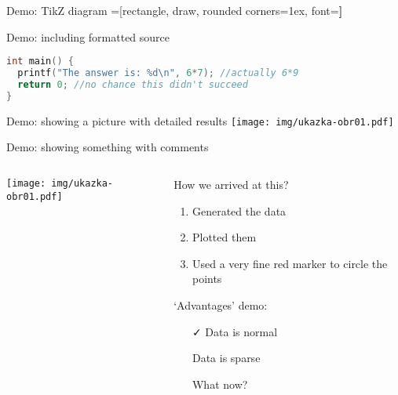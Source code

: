 \documentclass[aspectratio=169]{beamer}
\begin{document}
\begin{frame}{Demo: TikZ diagram}
\centering
{}=[rectangle, draw, rounded corners=1ex, font=\huge\bfseries]
\end{frame}

\begin{frame}[fragile]{Demo: including formatted source}

\begin{lstlisting}[language=C,showstringspaces=false,basicstyle=\tt\small,commentstyle=\color{green!50!black},keywordstyle=\bfseries\color{blue!50!black},stringstyle=\color{red!50!black}]
int main() {
  printf("The answer is: %d\n", 6*7); //actually 6*9
  return 0; //no chance this didn't succeed
}
\end{lstlisting}
\end{frame}

\begin{frame}{Demo: showing a picture with detailed results}
\centering
\texttt{[image: img/ukazka-obr01.pdf]}
\end{frame}

\begin{frame}{Demo: showing something with comments}
\begin{columns}
\begin{column}{0.5\textwidth}
\texttt{[image: img/ukazka-obr01.pdf]}
\end{column}
\begin{column}{0.5\textwidth}
How we arrived at this?
\begin{enumerate}
\item Generated the data
\item Plotted them
\item Used a very fine red marker to circle the points
\end{enumerate}

`Advantages' demo:

\begin{itemize}
\item[\color{green}\faCheck] Data is normal
\item[\color{red}\faTimes] Data is sparse
\item[\color{violet}\faQuestionCircle] What now?
\end{itemize}
\end{column}
\end{columns}
\end{frame}
\end{document}
